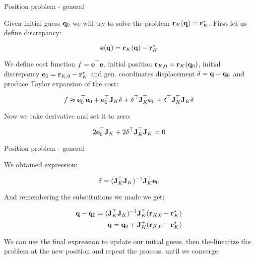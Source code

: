 \documentclass{beamer}
\begin{document}
\begin{frame}{Position problem - general}
	\begin{flushleft}
		
		Given initial guess $\mathbf{q}_0$ we will try to solve the problem $\mathbf{r}_K(\mathbf{q}) = \mathbf{r}_K^*$. First let us define discrepancy:
		
		\begin{equation}
			\mathbf{e}(\mathbf{q}) = \mathbf{r}_K(\mathbf{q}) - \mathbf{r}_K^*
		\end{equation}		
	
		We define cost function $f =\mathbf{e}^\top \mathbf{e}$, initial position $\mathbf{r}_{K, 0} = \mathbf{r}_K(\mathbf{q}_0)$, initial discrepancy $\mathbf{e}_0 =  \mathbf{r}_{K, 0} - \mathbf{r}_K^*$ and gen. coordinates displacement $\delta = \mathbf{q} - \mathbf{q}_0$ and produce Taylor expansion of the cost:
		
		\begin{equation}
			f \approx \mathbf{e}_0^\top \mathbf{e}_0 
			+
			\mathbf{e}_0^\top \mathbf{J}_K \delta
			+
			 \delta ^\top \mathbf{J}_K^\top \mathbf{e}_0
			  +
			  \delta ^\top \mathbf{J}_K^\top \mathbf{J}_K \delta
		\end{equation}	
	
	Now we take  derivative and set it to zero:
	
			\begin{equation}
		2 \mathbf{e}_0^\top \mathbf{J}_K
		+
		2 \delta ^\top \mathbf{J}_K^\top \mathbf{J}_K = 0
	\end{equation}	
		
	\end{flushleft}
\end{frame}



\begin{frame}{Position problem - general}
	\begin{flushleft}
		
		We obtained expression:
		
		\begin{equation}
			\delta = (\mathbf{J}_K^\top \mathbf{J}_K)^{-1} \mathbf{J}_K^\top \mathbf{e}_0
		\end{equation}	
	
	And remembering the substitutions we made we get:
	
	\begin{align}
		\mathbf{q} - \mathbf{q}_0 = (\mathbf{J}_K^\top \mathbf{J}_K)^{-1} \mathbf{J}_K^\top (\mathbf{r}_{K, 0} - \mathbf{r}_K^*) \\
		\mathbf{q} = \mathbf{q}_0 + \mathbf{J}_K^+(\mathbf{r}_{K, 0} - \mathbf{r}_K^*)
	\end{align}	

	We can use the final expression to update our initial guess, then the-linearize the problem at the new position and repeat the process, until we converge.
		
	\end{flushleft}
\end{frame}
\end{document}
